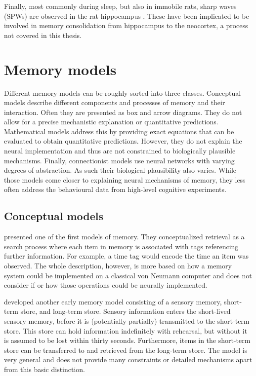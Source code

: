Finally, most commonly during sleep, but also in immobile rats, sharp waves (SPWs) are observed in the rat hippocampus \parencite{chrobak1994,girardeau2009}.
These have been implicated to be involved in memory consolidation from hippocampus to the neocortex, a process not covered in this thesis.


\section{Memory models}
Different memory models can be roughly sorted into three classes.
Conceptual models describe different components and processes of memory and their interaction.
Often they are presented as box and arrow diagrams.
They do not allow for a precise mechanistic explanation or quantitative predictions.
Mathematical models address this by providing exact equations that can be evaluated to obtain quantitative predictions.
However, they do not explain the neural implementation and thus are not constrained to biologically plausible mechanisms.
Finally, connectionist models use neural networks with varying degrees of abstraction.
As such their biological plausibility also varies.
While those models come closer to explaining neural mechanisms of memory, they less often address the behavioural data from high-level cognitive experiments.

\subsection{Conceptual models}
\Textcite{Yntema1963} presented one of the first models of memory.
They conceptualized retrieval as a search process where each item in memory is associated with tags referencing further information.
For example, a time tag would encode the time an item was observed.
The whole description, however, is more based on how a memory system could be implemented on a classical von Neumann computer and does not consider if or how those operations could be neurally implemented.

\Textcite{atkinson1968} developed another early memory model consisting of a sensory memory, short-term store, and long-term store.
Sensory information enters the short-lived sensory memory, before it is (potentially partially) transmitted to the short-term store.
This store can hold information indefinitely with rehearsal, but without it is assumed to be lost within thirty seconds.
Furthermore, items in the short-term store can be transferred to and retrieved from the long-term store.
The model is very general and does not provide many constraints or detailed mechanisms apart from this basic distinction.

